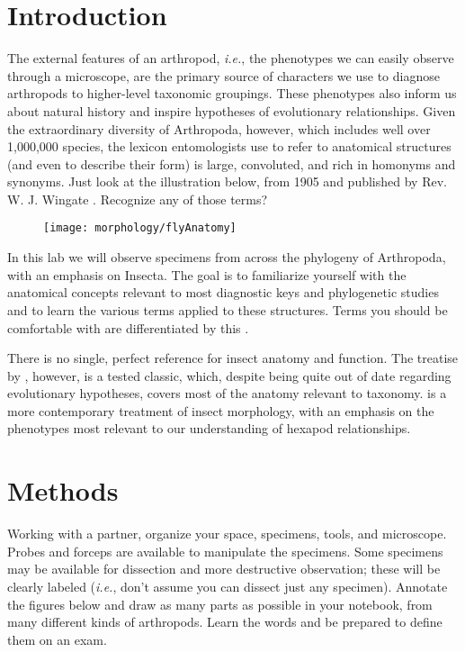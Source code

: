\section{Introduction}
The external features of an arthropod, \textit{i.e.}, the phenotypes we can easily observe through a microscope, are the primary source of characters we use to diagnose arthropods to higher-level taxonomic groupings. These phenotypes also inform us about natural history and inspire hypotheses of evolutionary relationships. Given the extraordinary diversity of Arthropoda, however, which includes well over 1,000,000 species, the lexicon entomologists use to refer to anatomical structures (and even to describe their form) is large, convoluted, and rich in homonyms and synonyms. Just look at the illustration below, from 1905 and published by Rev. W. J. Wingate \citeyearpar{wingate1906}. Recognize any of those terms?

\begin{figure}[ht!]
  \centering
    \texttt{[image: morphology/flyAnatomy]}
  \label{fig:flyAnatomy}
\end{figure}

In this lab we will observe specimens from across the phylogeny of Arthropoda, with an emphasis on Insecta. The goal is to familiarize yourself with the anatomical concepts relevant to most diagnostic keys and phylogenetic studies and to learn the various terms applied to these structures. Terms you should be comfortable with are differentiated by this .

There is no single, perfect reference for insect anatomy and function. The treatise by \cite{snodgrass1935principles}, however, is a tested classic, which, despite being quite out of date regarding evolutionary hypotheses, covers most of the anatomy relevant to taxonomy. \cite{beutel2013insect} is a more contemporary treatment of insect morphology, with an emphasis on the phenotypes most relevant to our understanding of hexapod relationships.

\section{Methods}
Working with a partner, organize your space, specimens, tools, and microscope. Probes and forceps are available to manipulate the specimens. Some specimens may be available for dissection and more destructive observation; these will be clearly labeled (\textit{i.e.}, don't assume you can dissect just any specimen). Annotate the figures below and draw as many parts as possible in your notebook, from many different kinds of arthropods. Learn the  words and be prepared to define them on an exam.

